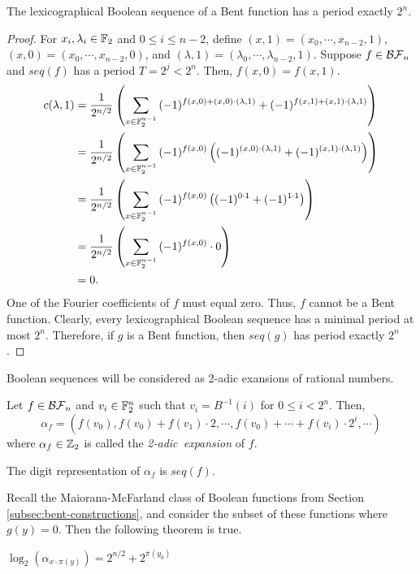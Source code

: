 \begin{theorem}
  The lexicographical Boolean sequence of a Bent function has a period
  exactly $2^n$.
\end{theorem}
\begin{proof}
  For $x_i,\lambda_i\in\mathbb{F}_2$ and $0\leq i\leq n-2$, define
  $(x,1)=\allowbreak(x_0,\cdots,\allowbreak x_{n-2},1)$,
  $(x,0)=\allowbreak(x_0,\cdots,\allowbreak x_{n-2},0)$, and
  $(\lambda,1)=\allowbreak(\lambda_0,\cdots,\allowbreak \lambda_{n-2},1)$.
  Suppose $f\in\mathcal{BF}_n$ and $seq(f)$ has a period $T=2^j<2^n$. Then,
  $f(x,0)=f(x,1)$.
  \begin{align*}
    c(\lambda,1)&=\frac{1}{2^{n/2}}
      \left(\sum_{x\in\mathbb{F}_2^{n-1}}
        {(-1)^{f(x,0)+(x,0)\cdot(\lambda,1)}+
        (-1)^{f(x,1)+(x,1)\cdot(\lambda,1)}}
      \right)\\
    &=\frac{1}{2^{n/2}}
      \left(\sum_{x\in\mathbb{F}_2^{n-1}}
        {(-1)^{f(x,0)}\left((-1)^{(x,0)\cdot(\lambda,1)}+
        (-1)^{(x,1)\cdot(\lambda,1)}\right)}
      \right)\\
    &=\frac{1}{2^{n/2}}
      \left(\sum_{x\in\mathbb{F}_2^{n-1}}
      {(-1)^{f(x,0)}\left((-1)^{0\cdot1}+(-1)^{1\cdot1}\right)}
      \right)\\
    &=\frac{1}{2^{n/2}}
      \left(\sum_{x\in\mathbb{F}_2^{n-1}}{(-1)^{f(x,0)}\cdot0}\right)\\
    &=0.
  \end{align*}
  One of the Fourier coefficients of $f$ must equal zero. Thus, $f$ cannot
  be a Bent function. Clearly, every lexicographical Boolean sequence has a
  minimal period at most $2^n$. Therefore, if $g$ is a Bent function, then
  $seq(g)$ has period exactly $2^n$.
\end{proof}

\par Boolean sequences will be considered as 2-adic exansions of rational
numbers.

\begin{definition}\label{2-adic-ex}
  Let $f\in\mathcal{BF}_n$ and $v_i\in\mathbb{F}_2^n$ such that $v_i=B^{-1}(i)$ for
  $0\leq i<2^n$. Then,
  \begin{equation}
    \alpha_f=(f(v_0),f(v_0)+f(v_1)\cdot2,\cdots,\allowbreak
      f(v_0)+\cdots\allowbreak+f(v_i)\cdot2^i,\allowbreak\cdots)
  \end{equation}
  where $\alpha_f\in\mathbb{Z}_2$ is called the {\em 2-adic\ expansion} of $f$.
\end{definition}

\begin{lemma}
  The digit representation of $\alpha_f$ is $seq(f)$.
\end{lemma}

\par Recall the Maiorana-McFarland class of Boolean functions from Section
\ref{subsec:bent-constructions}, and consider
the subset of these functions where $g(y)=0$. Then the following theorem is
true.

\begin{theorem}
  $\log_2(\alpha_{x\cdot\pi(y)})=2^{n/2}+2^{\bar{\pi}(y_0)}$
\end{theorem}
